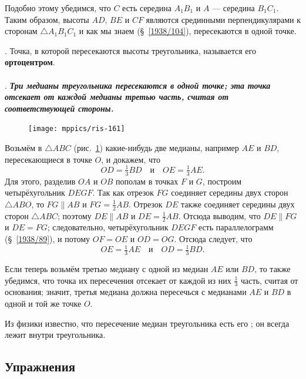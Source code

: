 \documentclass[oneside]{book}
\makeatletter
\newcommand{\rindex}[2][\imki@jobname]{%
  \index[#1]{\detokenize{#2}}%
}
\makeatother
\begin{document}
Подобно этому убедимся, что $C$ есть середина $A_1B_1$ и $A$ — середина $B_1C_1$.
Таким образом, высоты $AD$, $BE$ и $CF$ являются
срединными перпендикулярами к сторонам $\triangle A_1B_1C_1$ и как мы знаем (§~\ref{1938/104}), пересекаются в одной точке.

\smallskip
\mbox{.}
Точка, в которой пересекаются высоты треугольника, называется его \rindex{ортоцентр}\textbf{ортоцентром}.

\paragraph{}\label{1938/143} %
.
\textbf{\emph{Три медианы треугольника пересекаются в одной точке;
эта точка отсекает от каждой медианы третью часть, считая от соответствующей стороны.}}

\begin{figure}
\vskip-4mm
\centering
\texttt{[image: mppics/ris-161]}
\caption{}\label{1938/ris-161}
\end{figure}

Возьмём в $\triangle ABC$ (рис.~\ref{1938/ris-161}) какие-нибудь две медианы, например $AE$ и $BD$, пересекающиеся в точке $O$, и докажем, что
\[OD=\tfrac13 BD\quad\text{и}\quad OE = \tfrac13 AE.\]
Для этого, разделив $OA$ и $OB$ пополам в точках $F$ и $G$, построим четырёхугольник $DEGF$.
Так как отрезок $FG$ соединяет середины двух сторон $\triangle ABO$, то $FG\parallel AB$ и $FG=\tfrac12 AB$.
Отрезок $DE$ также соединяет середины двух сторон $\triangle ABC$;
поэтому $DE\parallel AB$ и $DE=\tfrac12 AB$.
Отсюда выводим, что $DE \parallel FG$ и $DE=FG$;
следовательно, четырёхугольник $DEGF$ есть параллелограмм (§~\ref{1938/89}), и потому $OF=OE$ и $OD=OG$.
Отсюда следует, что
\[ OE=\tfrac13AE\quad\text{и}\quad OD=\tfrac13 BD.\]

Если теперь возьмём третью медиану с одной из медиан $AE$ или $BD$, то также убедимся, что точка их пересечения отсекает от каждой из них $\tfrac13$ часть, считая от основания;
значит, третья медиана должна пересечься с медианами $AE$ и $BD$ в одной и той же точке $O$.

Из физики известно, что пересечение медиан треугольника есть его ;
он всегда лежит внутри треугольника.


\subsection*{Упражнения}
\end{document}
